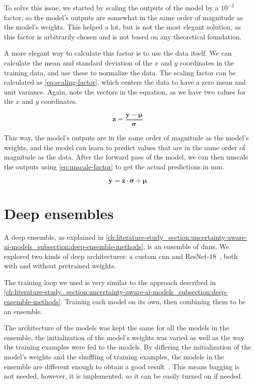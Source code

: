 To solve this issue, we started by scaling the outputs of the model by a $10^{-3}$ factor, so the model's outputs are somewhat in the same order of magnitude as the model's weights.
This helped a lot, but is not the most elegant solution, as this factor is arbitrarily chosen and is not based on any theoretical foundation.

A more elegant way to calculate this factor is to use the data itself.
We can calculate the mean and standard deviation of the $x$ and $y$ coordinates in the training data, and use these to normalize the data.
The scaling factor can be calculated as \cref{eq:scaling-factor}, which centers the data to have a zero mean and unit variance.
Again, note the vectors in the equation, as we have two values for the $x$ and $y$ coordinates.

\begin{equation}\label{eq:scaling-factor}
    \mathbf{z} = \frac{\mathbf{y} - \bm{\mu}}{\bm{\sigma}}
\end{equation}

This way, the model's outputs are in the same order of magnitude as the model's weights, and the model can learn to predict values that are in the same order of magnitude as the data.
After the forward pass of the model, we can then unscale the outputs using \cref{eq:unscale-factor} to get the actual predictions in mm.

\begin{equation}\label{eq:unscale-factor}
    \mathbf{y} = \mathbf{z} \cdot \bm{\sigma} + \bm{\mu}
\end{equation}

\section{Deep ensembles}\label{ch:models-for-uncertainty-aware-object-detection_section:deep-ensembles}
A deep ensemble, as explained in \cref{ch:literature-study_section:uncertainty-aware-ai-models_subsection:deep-ensemble-methods}, is an ensemble of \glspl{dnn}.
We explored two kinds of deep architectures: a custom \gls{cnn} and ResNet-18~\cite{src:resnet}, both with and without pretrained weights.

The training loop we used is very similar to the approach described in \cref{ch:literature-study_section:uncertainty-aware-ai-models_subsection:deep-ensemble-methods}.
Training each model on its own, then combining them to be an ensemble.

The architecture of the models was kept the same for all the models in the ensemble, the initialization of the model's weights was varied as well as the way the training examples were fed to the models.
By differing the initialization of the model's weights and the shuffling of training examples, the models in the ensemble are different enough to obtain a good result~\cite{src:deep-ensemble-methods}.
This means bagging is not needed, however, it is implemented, so it can be easily turned on if needed.

